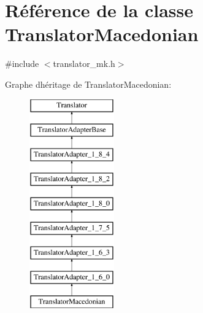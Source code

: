 \hypertarget{class_translator_macedonian}{}\section{Référence de la classe Translator\+Macedonian}
\label{class_translator_macedonian}


{\ttfamily \#include $<$translator\+\_\+mk.\+h$>$}

Graphe d\textquotesingle{}héritage de Translator\+Macedonian\+:\begin{figure}[H]
\begin{center}
\leavevmode
\includegraphics[height=9.000000cm]{class_translator_macedonian}
\end{center}
\end{figure}
